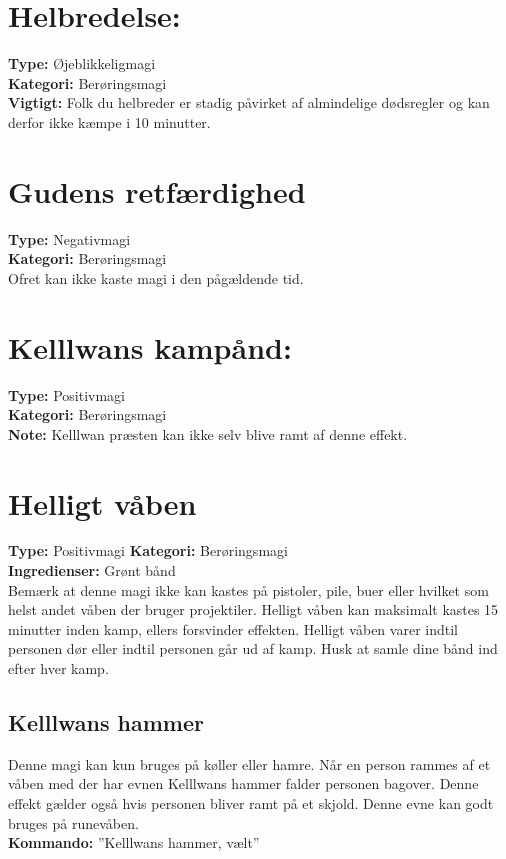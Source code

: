 \section{Helbredelse:}
\textbf{Type:} Øjeblikkeligmagi\\ 
\textbf{Kategori:} Berøringsmagi\\
\textbf{Vigtigt:} Folk du helbreder er stadig påvirket af almindelige dødsregler og kan derfor ikke kæmpe i 10 minutter.

\section{Gudens retfærdighed}
\textbf{Type:} Negativmagi\\ 
\textbf{Kategori:} Berøringsmagi\\
Ofret kan ikke kaste magi i den pågældende tid.

\section{Kelllwans kampånd:}
\textbf{Type:} Positivmagi\\ 
\textbf{Kategori:} Berøringsmagi\\
\textbf{Note:} Kelllwan præsten kan ikke selv blive ramt af denne effekt.

\section{Helligt våben}
\textbf{Type:} Positivmagi
\textbf{Kategori:} Berøringsmagi\\
\textbf{Ingredienser:} Grønt bånd\\
Bemærk at denne magi ikke kan kastes på pistoler, pile, buer eller hvilket som helst andet våben der bruger projektiler. Helligt våben kan maksimalt kastes 15 minutter inden kamp, ellers forsvinder effekten. Helligt våben varer indtil personen dør eller indtil personen går ud af kamp. Husk at samle
dine bånd ind efter hver kamp.\\

\subsection{Kelllwans hammer}
Denne magi kan kun bruges på køller eller hamre. Når en person rammes af et våben med der har evnen Kelllwans hammer falder personen bagover. Denne effekt gælder også hvis personen bliver ramt på et skjold. Denne evne kan godt bruges på runevåben.\\ 
\textbf{Kommando:} ”Kelllwans hammer, vælt”
